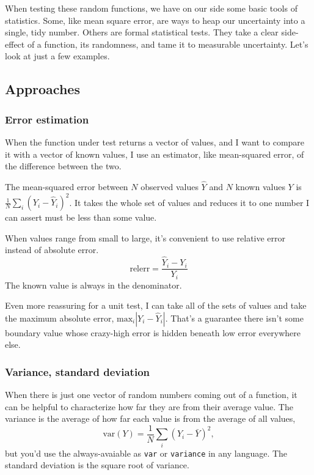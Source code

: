 \documentclass[fleqn,10pt]{olplainarticle}
\begin{document}
When testing these random functions,
we have on our side some basic tools
of statistics. Some, like mean square error, are ways
to heap our uncertainty into a single, tidy number.
Others are formal statistical
tests. They take a clear side-effect of a function,
its randomness, and tame it to measurable uncertainty.
Let's look at just a few examples.

\subsection{Approaches}

\subsubsection{Error estimation}
When the function under test returns a vector of values,
and I want to compare it with a vector of known values,
I use an estimator, like mean-squared error, of the difference
between the two.

The mean-squared error between $N$ observed values $\hat{Y}$ and $N$ known values $Y$ is $\frac{1}{N}\sum_i (Y_i - \hat{Y}_i)^2$.
It takes the whole set of values and reduces it to one number I can assert must be less than some value.

When values range from small to large, it's convenient to use
relative error instead of absolute error.
\begin{equation}
  \mbox{relerr} = \frac{\hat{Y}_i - Y_i}{Y_i}
\end{equation}
The known value is always in the denominator.

Even more reassuring for a unit test, I can take all of the
sets of values and take the maximum absolute error,
$\mbox{max}_i |Y_i-\hat{Y}_i|$. That's a guarantee there isn't
some boundary value whose crazy-high error is hidden beneath
low error everywhere else.

\subsubsection{Variance, standard deviation}
When there is just one vector of random numbers coming out
of a function, it can be helpful to characterize how far
they are from their average value. The variance is
the average of how far each value is from the average of all
values,
\begin{equation}
  \mbox{var}(Y) = \frac{1}{N}\sum_i (Y_i - \bar{Y})^2,
\end{equation}
but you'd use the always-avaiable
as \lstinline!var! or \lstinline!variance! in any language.
The standard deviation is the square root of variance.
\end{document}
